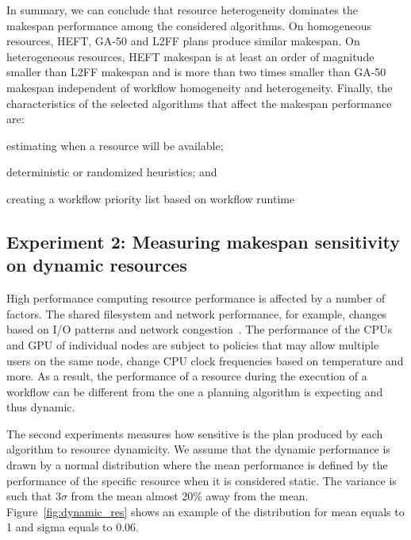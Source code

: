In summary, we can conclude that resource heterogeneity dominates the makespan performance among the considered algorithms.
On homogeneous resources, HEFT, GA-50 and L2FF plans produce similar makespan.
On heterogeneous resources, HEFT makespan is at least an order of magnitude smaller than L2FF makespan and is more than two times smaller than GA-50 makespan independent of workflow homogeneity and heterogeneity.
Finally, the characteristics of the selected algorithms that affect the makespan performance are:
\begin{inparaenum}[1)]
    \item estimating when a resource will be available;
    \item deterministic or randomized heuristics; and
    \item creating a workflow priority list based on workflow runtime
\end{inparaenum}

\subsection{Experiment 2: Measuring makespan sensitivity on dynamic resources}

High performance computing resource performance is affected by a number of factors.
The shared filesystem and network performance, for example, changes based on I/O patterns and network congestion~\cite{brown2018interference}.
The performance of the CPUs and GPU of individual nodes are subject to policies that may allow multiple users on the same node, change CPU clock frequencies based on temperature and more.
As a result, the performance of a resource during the execution of a workflow can be different from the one a planning algorithm is expecting and thus dynamic.

The second experiments measures how sensitive is the plan produced by each algorithm to resource dynamicity.
We assume that the dynamic performance is drawn by a normal distribution where the mean performance is defined by the performance of the specific resource when it is considered static.
The variance is such that $3\sigma$ from the mean almost 20\% away from the mean.
Figure~\ref{fig:dynamic_res} shows an example of the distribution for mean equals to 1 and sigma equals to 0.06.

